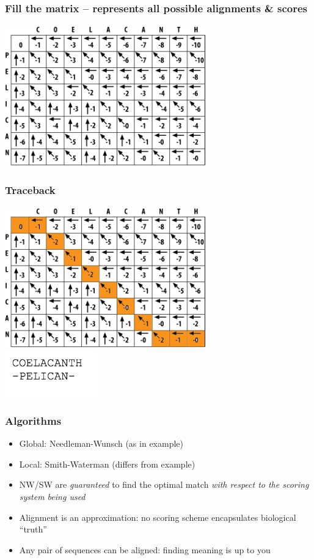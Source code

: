 \documentclass[table]{beamer}
\begin{document}
    \begin{frame}
     \frametitle{Fill the matrix -- represents all possible alignments \& scores}
       \begin{center}
         \includegraphics[width=0.65\textwidth]{images/full_matrix}
       \end{center}
    \end{frame}  
   
    \begin{frame}
     \frametitle{Traceback}
       \begin{center}
         \includegraphics[width=0.65\textwidth]{images/traceback} \\
         \includegraphics[width=0.3\textwidth]{images/traceback_sequence}         
       \end{center}
    \end{frame}     

    \begin{frame}
     \frametitle{Algorithms}
       \begin{itemize}
         \item<1-> Global: Needleman-Wunsch (as in example)
         \item<1-> Local: Smith-Waterman (differs from example)
         \item<2-> NW/SW are \emph{guaranteed} to find the optimal match \emph{with respect to the scoring system being used}
         \item<2-> Alignment is an approximation: no scoring scheme encapsulates biological ``truth''
         \item<2-> Any pair of sequences can be aligned: finding meaning is up to you
       \end{itemize}
    \end{frame}   
\end{document}
